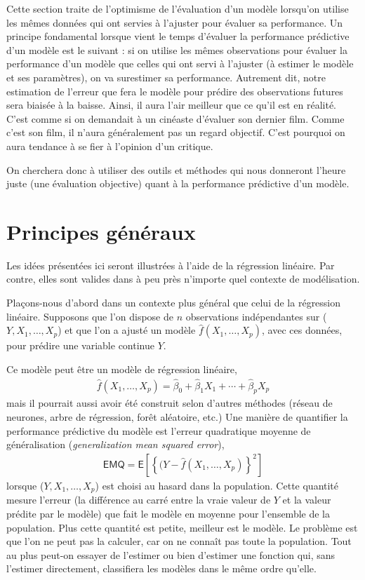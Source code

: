 \documentclass[
  11pt,
  letterpaper,
]{book}
\theoremstyle{definition}
\theoremstyle{definition}
\theoremstyle{definition}
\theoremstyle{remark}
\begin{document}
Cette section traite de l'optimisme de l'évaluation d'un modèle lorsqu'on utilise les mêmes données qui ont servies à l'ajuster pour évaluer sa performance. Un principe fondamental lorsque vient le temps d'évaluer la performance prédictive d'un modèle est le suivant : si on utilise les mêmes observations pour évaluer la performance d'un modèle que celles qui ont servi à l'ajuster (à estimer le modèle et ses paramètres), on va surestimer sa performance. Autrement dit, notre estimation de l'erreur que fera le modèle pour prédire des observations futures sera biaisée à la baisse. Ainsi, il aura l'air meilleur que ce qu'il est en réalité. C'est comme si on demandait à un cinéaste d'évaluer son dernier film. Comme c'est son film, il n'aura généralement pas un regard objectif. C'est pourquoi on aura tendance à se fier à l'opinion d'un critique.

On cherchera donc à utiliser des outils et méthodes qui nous donneront l'heure juste (une évaluation objective) quant à la performance prédictive d'un modèle.

\hypertarget{principes-guxe9nuxe9raux}{%
\section{Principes généraux}\label{principes-guxe9nuxe9raux}}

Les idées présentées ici seront illustrées à l'aide de la régression linéaire. Par contre, elles sont valides dans à peu près n'importe quel contexte de modélisation.

Plaçons-nous d'abord dans un contexte plus général que celui de la régression linéaire. Supposons que l'on dispose de \(n\) observations indépendantes sur (\(Y, X_1, \ldots, X_p\)) et que l'on a ajusté un modèle \(\widehat{f}(X_1, \ldots, X_p)\), avec ces données, pour prédire une variable continue \(Y\).

Ce modèle peut être un modèle de régression linéaire,
\begin{align*}
\widehat{f}(X_1, \ldots, X_p) = \widehat{\beta}_0 + \widehat{\beta}_1X_1 + \cdots + \widehat{\beta}_pX_p
\end{align*}
mais il pourrait aussi avoir été construit selon d'autres méthodes (réseau de neurones, arbre de régression, forêt aléatoire, etc.) Une manière de quantifier la performance prédictive du modèle est l'erreur quadratique moyenne de généralisation (\emph{generalization mean squared error}),
\begin{align*}
\mathsf{EMQ}=\mathsf{E}\left[\left\{(Y-\widehat{f}(X_1, \ldots, X_p)\right\}^2\right]
\end{align*}
lorsque (\(Y, X_1, \ldots, X_p\)) est choisi au hasard dans la population. Cette quantité mesure l'erreur (la différence au carré entre la vraie valeur de \(Y\) et la valeur prédite par le modèle) que fait le modèle en moyenne pour l'ensemble de la population. Plus cette quantité est petite, meilleur est le modèle. Le problème est que l'on ne peut pas la calculer, car on ne connaît pas toute la population. Tout au plus peut-on essayer de l'estimer ou bien d'estimer une fonction qui, sans l'estimer directement, classifiera les modèles dans le même ordre qu'elle.
\end{document}
